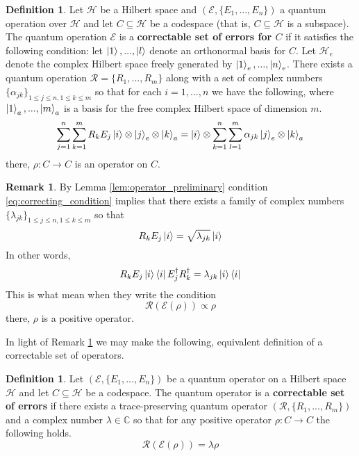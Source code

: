 \documentclass[12pt]{article}
\theoremstyle{plain}
\theoremstyle{definition}
\newtheorem{defn}[thm]{Definition} %
\newtheorem{remark}[thm]{Remark}
\newcommand{\bb}[1]{\mathbb{#1}}
\newcommand{\call}[1]{\mathcal{#1}}
\newcommand{\lto}{\longrightarrow}
\begin{document}
\begin{defn}\label{def:correctable}
	Let $\call{H}$ be a Hilbert space and $(\call{E}, \lbrace E_1,...,E_n\rbrace)$ a quantum operation over $\call{H}$ and let $C \subseteq \call{H}$ be a codespace (that is, $C \subseteq \call{H}$ is a subspace). The quantum operation $\call{E}$ is a \textbf{correctable set of errors for $C$} if it satisfies the following condition: let $\ket{1},...,\ket{l}$ denote an orthonormal basis for $C$. Let $\call{H}_e$ denote the complex Hilbert space freely generated by $\ket{1}_e,...,\ket{n}_e$. There exists a quantum operation $\call{R} = \lbrace R_1,...,R_m\rbrace$ along with a set of complex numbers $\lbrace \alpha_{jk}\rbrace_{1 \leq j \leq n, 1 \leq k \leq m}$ so that for each $i = 1,...,n$ we have the following, where $\ket{1}_a,...,\ket{m}_a$ is a basis for the free complex Hilbert space of dimension $m$.
	\begin{equation}\label{eq:correcting_condition}
		\sum_{j = 1}^n\sum_{k = 1}^m R_k E_j \ket{i} \otimes \ket{j}_e \otimes \ket{k}_a = \ket{i} \otimes \sum_{k = 1}^n \sum_{l = 1}^m \alpha_{jk} \ket{j}_e \otimes \ket{k}_a
	\end{equation}
	there, $\rho: C \lto C$ is an operator on $C$.
\end{defn}
\begin{remark}\label{rmk:operator_transition}
	By Lemma \ref{lem:operator_preliminary} condition \eqref{eq:correcting_condition} implies that there exists a family of complex numbers $\lbrace \lambda_{jk}\rbrace_{1 \leq j \leq n, 1 \leq k \leq m}$ so that
	\begin{equation}
		R_kE_j\ket{i} = \sqrt{\lambda_{jk}}\ket{i}
	\end{equation}
	In other words,
	\begin{equation}
		R_kE_j \ket{i} \bra{i}E_j^\dagger R_k^\dagger = \lambda_{jk} \ket{i}\bra{i}
	\end{equation}
	This is what \cite{quantum_computing} mean when they write the condition
	\begin{equation}
		\call{R}(\call{E}(\rho)) \propto \rho
	\end{equation}
	there, $\rho$ is a positive operator.
\end{remark}
In light of Remark \ref{rmk:operator_transition} we may make the following, equivalent definition of a correctable set of operators.
\begin{defn}
	Let $(\call{E}, \lbrace E_1,...,E_n\rbrace)$ be a quantum operator on a Hilbert space $\call{H}$ and let $C \subseteq \call{H}$ be a codespace. The quantum operator is a \textbf{correctable set of errors} if there exists a trace-preserving quantum operator $(\call{R}, \lbrace R_1,...,R_m\rbrace)$ and a complex number $\lambda \in \bb{C}$ so that for any positive operator $\rho: C \lto C$ the following holds.
	\begin{equation}
		\call{R}(\call{E}(\rho)) = \lambda \rho
	\end{equation}
\end{defn}
\end{document}

